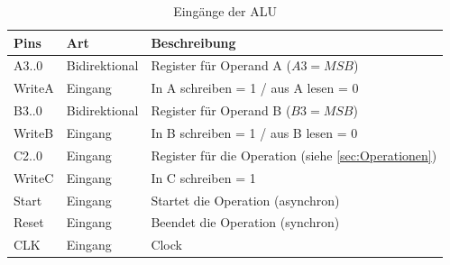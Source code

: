 \begin{table}[h]
  \begin{tabular}{|p{1.5cm}|p{2.5cm}|p{7.4592cm}|}
    \hline
    \textbf{Pins} & \textbf{Art}  & \textbf{Beschreibung}                                    \\
    \hline
    A3..0         & Bidirektional & Register für Operand A ($A3 = MSB$)                      \\
    WriteA        & Eingang       & In A schreiben = 1 / aus A lesen = 0                     \\
    \hline
    B3..0         & Bidirektional & Register für Operand B ($B3 = MSB$)                      \\
    WriteB        & Eingang       & In B schreiben = 1 / aus B lesen = 0                     \\
    \hline
    C2..0         & Eingang       & Register für die Operation (siehe \ref{sec:Operationen}) \\
    WriteC        & Eingang       & In C schreiben = 1                                       \\
    \hline
    Start         & Eingang       & Startet die Operation (asynchron)                        \\
    \hline
    Reset         & Eingang       & Beendet die Operation (synchron)                         \\
    \hline
    CLK           & Eingang       & Clock                                                    \\
    \hline
  \end{tabular}
  \caption{Eingänge der ALU}
  \label{fig:Eingänge der ALU}
\end{table}


